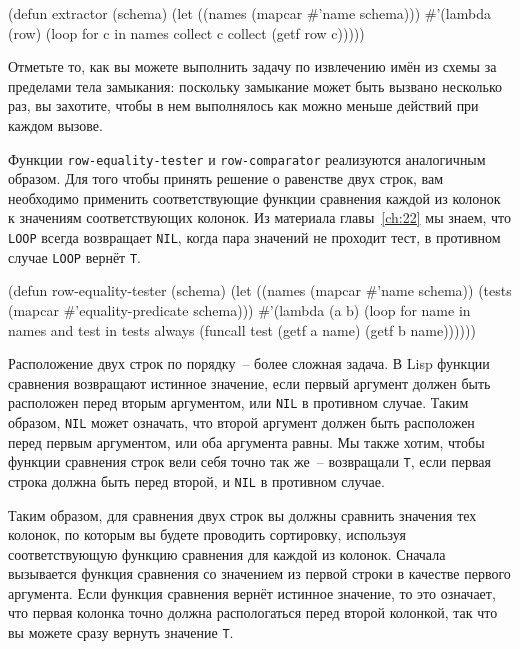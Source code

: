 \begin{myverb}
(defun extractor (schema)
  (let ((names (mapcar #'name schema)))
    #'(lambda (row)
        (loop for c in names collect c collect (getf row c)))))
\end{myverb}

Отметьте то, как вы можете выполнить задачу по извлечению имён из схемы за пределами тела
замыкания: поскольку замыкание может быть вызвано несколько раз, вы захотите, чтобы в нем
выполнялось как можно меньше действий при каждом вызове.

Функции \lstinline{row-equality-tester} и \lstinline{row-comparator} реализуются аналогичным
образом.  Для того чтобы принять решение о равенстве двух строк, вам необходимо применить
соответствующие функции сравнения каждой из колонок к значениям соответствующих колонок.
Из материала главы~\ref{ch:22} мы знаем, что \lstinline{LOOP} всегда возвращает \lstinline{NIL},
когда пара значений не проходит тест, в противном случае \lstinline{LOOP} вернёт \lstinline{T}.

\begin{myverb}
(defun row-equality-tester (schema)
  (let ((names (mapcar #'name schema))
        (tests (mapcar #'equality-predicate schema)))
    #'(lambda (a b)
        (loop for name in names and test in tests
           always (funcall test (getf a name) (getf b name))))))
\end{myverb}

Расположение двух строк по порядку~-- более сложная задача.  В Lisp функции сравнения
возвращают истинное значение, если первый аргумент должен быть расположен перед вторым
аргументом, или \lstinline{NIL} в противном случае.  Таким образом, \lstinline{NIL} может означать,
что второй аргумент должен быть расположен перед первым аргументом, или оба аргумента
равны. Мы также хотим, чтобы функции сравнения строк вели себя точно так же~-- возвращали
\lstinline{T}, если первая строка должна быть перед второй, и \lstinline{NIL} в противном случае.

Таким образом, для сравнения двух строк вы должны сравнить значения тех колонок, по
которым вы будете проводить сортировку, используя соответствующую функцию сравнения для
каждой из колонок.  Сначала вызывается функция сравнения со значением из первой строки в
качестве первого аргумента.  Если функция сравнения вернёт истинное значение, то это
означает, что первая колонка точно должна распологаться перед второй колонкой, так что вы
можете сразу вернуть значение \lstinline{T}.

